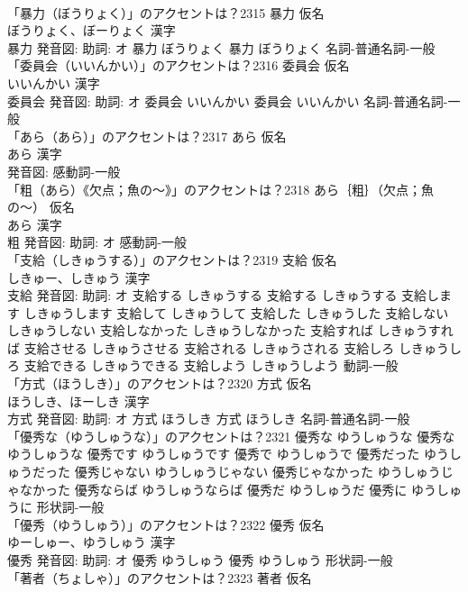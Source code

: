 \documentclass[8pt]{extreport}
\begin{document}
\begin{CJK}{UTF8}{min}
\\	「暴力（ぼうりょく）」のアクセントは？2315	暴力 仮名　
\\	ぼうりょく、ぼーりょく 漢字　
\\	暴力 発音図: 助詞: オ	暴力 ぼうりょく		暴力 ぼうりょく				名詞-普通名詞-一般 
\\	「委員会（いいんかい）」のアクセントは？2316	委員会 仮名　
\\	いいんかい 漢字　
\\	委員会 発音図: 助詞: オ	委員会 いいんかい		委員会 いいんかい				名詞-普通名詞-一般 
\\	「あら（あら）」のアクセントは？2317	あら 仮名　
\\	あら 漢字　
\\	発音図:							感動詞-一般 
\\	「粗（あら）《欠点；魚の〜》」のアクセントは？2318	あら｛粗｝（欠点；魚の〜） 仮名　
\\	あら 漢字　
\\	粗 発音図: 助詞: オ							感動詞-一般 
\\	「支給（しきゅうする）」のアクセントは？2319	支給 仮名　
\\	しきゅー、しきゅう 漢字　
\\	支給 発音図: 助詞: オ	支給する しきゅうする		支給する しきゅうする 支給します しきゅうします 支給して しきゅうして 支給した しきゅうした 支給しない しきゅうしない 支給しなかった しきゅうしなかった 支給すれば しきゅうすれば 支給させる しきゅうさせる 支給される しきゅうされる 支給しろ しきゅうしろ 支給できる しきゅうできる 支給しよう しきゅうしよう				動詞-一般 
\\	「方式（ほうしき）」のアクセントは？2320	方式 仮名　
\\	ほうしき、ほーしき 漢字　
\\	方式 発音図: 助詞: オ	方式 ほうしき		方式 ほうしき				名詞-普通名詞-一般 
\\	「優秀な（ゆうしゅうな）」のアクセントは？2321		優秀な ゆうしゅうな		優秀な ゆうしゅうな 優秀です ゆうしゅうです 優秀で ゆうしゅうで 優秀だった ゆうしゅうだった 優秀じゃない ゆうしゅうじゃない 優秀じゃなかった ゆうしゅうじゃなかった 優秀ならば ゆうしゅうならば 優秀だ ゆうしゅうだ 優秀に ゆうしゅうに				形状詞-一般 
\\	「優秀（ゆうしゅう）」のアクセントは？2322	優秀 仮名　
\\	ゆーしゅー、ゆうしゅう 漢字　
\\	優秀 発音図: 助詞: オ	優秀 ゆうしゅう		優秀 ゆうしゅう				形状詞-一般 
\\	「著者（ちょしゃ）」のアクセントは？2323	著者 仮名　

\end{CJK}
\end{document}
